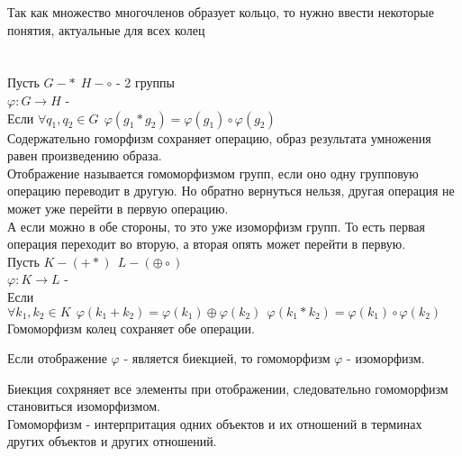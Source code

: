 Так как множество многочленов образует кольцо, то нужно ввести некоторые
понятия, актуальные для всех колец \\

 \\
 \\
Пусть $G - * ~~ H - \circ$ - 2 группы \\
$\varphi: G \to H$ -  \\
Если $\forall q_{1},q_{2} \in G ~~ \varphi(g_{1} * g_{2}) = \varphi(g_{1}) \circ
\varphi(g_{2})$ \\
Содержательно гоморфизм сохраняет операцию, образ результата умножения равен
произведению образа.\\
Отображение называется гомоморфизмом групп, если оно одну групповую операцию
переводит в другую. Но обратно вернуться нельзя, другая операция не может уже
перейти в первую операцию.\\
А если можно в обе стороны, то это уже изоморфизм групп. 
То есть первая операция переходит во вторую, а вторая
опять может перейти в первую.\\

Пусть $K - (+*) ~~ L - (\oplus \circ)$ \\
$\varphi: K \to L$ -  \\
Если $\forall k_{1}, k_{2} \in K ~~ \varphi(k_{1} + k_{2}) = \varphi(k_{1})
\oplus \varphi(k_{2}) ~~ \varphi(k_{1} * k_{2}) = \varphi(k_{1}) \circ
\varphi(k_{2})$ \\
Гомоморфизм колец сохраняет обе операции. \\

\begin{defin}
Если отображение $\varphi$ - является биекцией, то гомоморфизм $\varphi$ -
изоморфизм.
\end{defin}

Биекция сохряняет все элементы при отображении, следовательно гомоморфизм
становиться изоморфизмом.\\
Гомоморфизм - интерпритация одних объектов и их отношений в терминах других
объектов и других отношений. \\
